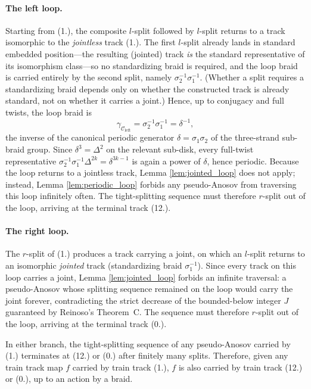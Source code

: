 \paragraph{The left loop.} Starting from (1.), the composite $l$-split followed by $l$-split returns to a track isomorphic to the \emph{jointless} track (1.). The first $l$-split already lands in standard embedded position---the resulting (jointed) track \emph{is} the standard representative of its isomorphism class---so no standardizing braid is required, and the loop braid is carried entirely by the second split, namely $\sigma_2^{-1}\sigma_1^{-1}$. (Whether a split requires a standardizing braid depends only on whether the constructed track is already standard, not on whether it carries a joint.) Hence, up to conjugacy and full twists, the loop braid is
\[
\gamma_{\mathcal{C}_{\mathrm{left}}} = \sigma_2^{-1}\sigma_1^{-1} = \delta^{-1},
\]
the inverse of the canonical periodic generator $\delta = \sigma_1\sigma_2$ of the three-strand sub-braid group. Since $\delta^3 = \Delta^2$ on the relevant sub-disk, every full-twist representative $\sigma_2^{-1}\sigma_1^{-1}\Delta^{2k} = \delta^{3k-1}$ is again a power of $\delta$, hence periodic. Because the loop returns to a jointless track, Lemma \ref{lem:jointed_loop} does not apply; instead, Lemma \ref{lem:periodic_loop} forbids any pseudo-Anosov from traversing this loop infinitely often. The tight-splitting sequence must therefore $r$-split out of the loop, arriving at the terminal track (12.).

\paragraph{The right loop.} The $r$-split of (1.) produces a track carrying a joint, on which an $l$-split returns to an isomorphic \emph{jointed} track (standardizing braid $\sigma_1^{-1}$). Since every track on this loop carries a joint, Lemma \ref{lem:jointed_loop} forbids an infinite traversal: a pseudo-Anosov whose splitting sequence remained on the loop would carry the joint forever, contradicting the strict decrease of the bounded-below integer $J$ guaranteed by Reinoso's Theorem~C. The sequence must therefore $r$-split out of the loop, arriving at the terminal track (0.).

In either branch, the tight-splitting sequence of any pseudo-Anosov carried by (1.) terminates at (12.) or (0.) after finitely many splits. Therefore, given any train track map $f$ carried by train track (1.), $f$ is also carried by train track (12.) or (0.), up to an action by a braid.

